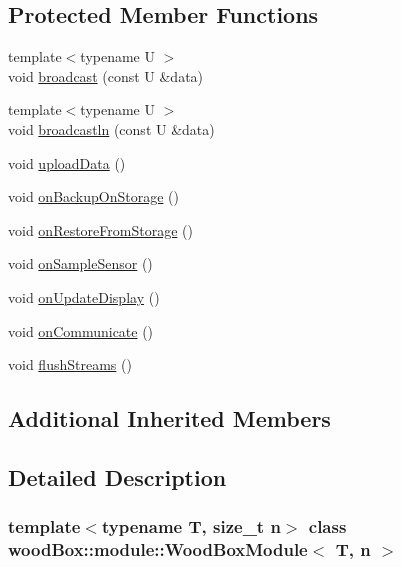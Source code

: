\subsection*{Protected Member Functions}
\begin{DoxyCompactItemize}
\item 
{\footnotesize template$<$typename U $>$ }\\void \mbox{\hyperlink{classwood_box_1_1module_1_1_wood_box_module_ac481cbb3ee83f192218a5943c59d74fe}{broadcast}} (const U \&data)
\item 
{\footnotesize template$<$typename U $>$ }\\void \mbox{\hyperlink{classwood_box_1_1module_1_1_wood_box_module_a5329c737b0a102851782b5d2a6019bc8}{broadcastln}} (const U \&data)
\item 
void \mbox{\hyperlink{classwood_box_1_1module_1_1_wood_box_module_a4fa136e3e3f29c71d12a8163b4c5a765}{upload\+Data}} ()
\item 
void \mbox{\hyperlink{classwood_box_1_1module_1_1_wood_box_module_a28c9b89bc3429d6e78fa38698c78d553}{on\+Backup\+On\+Storage}} ()
\item 
void \mbox{\hyperlink{classwood_box_1_1module_1_1_wood_box_module_a89395caa73cadc63c576931b45400c2d}{on\+Restore\+From\+Storage}} ()
\item 
void \mbox{\hyperlink{classwood_box_1_1module_1_1_wood_box_module_a227e8b23e8435f622f4d59eb6847e98b}{on\+Sample\+Sensor}} ()
\item 
void \mbox{\hyperlink{classwood_box_1_1module_1_1_wood_box_module_a1461bd1a53529065541c87fc03a28f57}{on\+Update\+Display}} ()
\item 
void \mbox{\hyperlink{classwood_box_1_1module_1_1_wood_box_module_acacb4ac748c70bd1f172d9a87e07dfbf}{on\+Communicate}} ()
\item 
void \mbox{\hyperlink{classwood_box_1_1module_1_1_wood_box_module_a240ad6ff3f905a531fcc62670a26a6fa}{flush\+Streams}} ()
\end{DoxyCompactItemize}
\subsection*{Additional Inherited Members}


\subsection{Detailed Description}
\subsubsection*{template$<$typename T, size\+\_\+t n$>$\newline
class wood\+Box\+::module\+::\+Wood\+Box\+Module$<$ T, n $>$}

